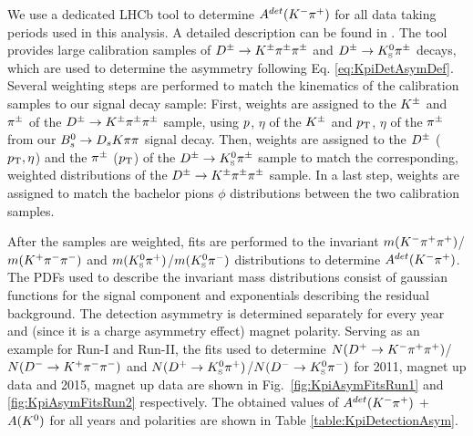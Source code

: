 We use a dedicated LHCb tool to determine $A^{det}(\Km\pip)$ for all data taking periods used in this analysis. A detailed description can be found in \cite{Davis:2310213}.
The tool provides large calibration samples of $\Dpm\to\Kpm\pipm\pipm$ and $\Dpm\to\KS\pipm$ decays, which are used to determine the asymmetry following Eq. \ref{eq:KpiDetAsymDef}. 
Several weighting steps are performed to match the kinematics of the calibration samples to our signal decay sample: \newline
First, weights are assigned to the $\Kpm$ and $\pipm$ of the $\Dpm\to\Kpm\pipm\pipm$ sample, using $\ptot$, $\eta$ of the $\Kpm$ and $\pt$, $\eta$ of the $\pipm$ from our $\Bs\to\Ds\kaon\pion\pion$ signal decay.
Then, weights are assigned to the $\Dpm$ ($\pt, \eta$) and the $\pipm$ ($\pt$) of the $\Dpm\to\KS\pipm$ sample to match the corresponding, weighted distributions of the $\Dpm\to\Kpm\pipm\pipm$ sample.
In a last step, weights are assigned to match the bachelor pions $\phi$ distributions between the two calibration samples.

After the samples are weighted, fits are performed to the invariant $m(\Km\pip\pip)$/$m(\Kp\pim\pim)$ and $m(\KS\pip)$/$m(\KS\pim)$ distributions to determine $A^{det}(\Km\pip)$. 
The PDFs used to describe the invariant mass distributions consist of gaussian functions for the signal component and exponentials describing the residual background.
The detection asymmetry is determined separately for every year and (since it is a charge asymmetry effect) magnet polarity. 
Serving as an example for Run-I and Run-II, the fits used to determine $N(\Dp\to\Km\pip\pip)$/$N(\Dm\to\Kp\pim\pim)$ and $N(\Dp\to\KS\pip)$/$N(\Dm\to\KS\pim)$ 
for 2011, magnet up data and 2015, magnet up data are shown in Fig.~\ref{fig:KpiAsymFitsRun1} and \ref{fig:KpiAsymFitsRun2} respectively.
The obtained values of $A^{det}(\Km\pip)$ + $A(\Kz)$ for all years and polarities are shown in Table \ref{table:KpiDetectionAsym}.

